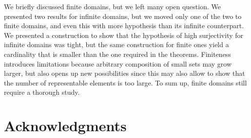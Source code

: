 We briefly discussed finite domains, but we left many open question. We presented two results for infinite domains, but we moved only one of the two to finite domains, and even this with more hypothesis than its infinite counterpart. We presented a construction to show that the hypothesis of high surjectivity for infinite domains was tight, but the same construction for finite ones yield a cardinality that is smaller than the one required in the theorems. Finiteness introduces limitations because arbitrary composition of small sets may grow larger, but also opens up new possibilities since this may also allow to show that the number of representable elements is too large.
To sum up, finite domains still require a thorough study.

\section{Acknowledgments}
\todo{}